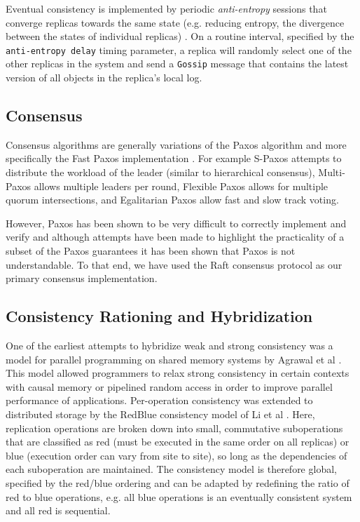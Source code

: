 \documentclass{article}
\begin{document}
Eventual consistency is implemented by periodic \textit{anti-entropy} sessions that converge replicas towards the same state (e.g. reducing entropy, the divergence between the states of individual replicas) \cite{kempe_gossip-based_2003, karp_randomized_2000}. On a routine interval, specified by the \texttt{anti-entropy delay} timing parameter, a replica will randomly select one of the other replicas in the system and send a \texttt{Gossip} message that contains the latest version of all objects in the replica's local log.

\subsection{Consensus}

Consensus algorithms are generally variations of the Paxos algorithm \cite{lamport_paxos_2001} and more specifically the Fast Paxos implementation \cite{lamport_fast_2006}. For example S-Paxos \cite{biely_s-paxos:_2012} attempts to distribute the workload of the leader (similar to hierarchical consensus), Multi-Paxos \cite{camargos_multicoordinated_2007} allows multiple leaders per round, Flexible Paxos \cite{2016arXiv160806696H} allows for multiple quorum intersections, and Egalitarian Paxos \cite{moraru_egalitarian_2012,moraru_there_2013} allow fast and slow track voting.

However, Paxos has been shown to be very difficult to correctly implement and verify \cite{chandra_paxos_2007} and although attempts have been made to highlight the practicality of a subset of the Paxos guarantees \cite{mazieres_paxos_2007} it has been shown that Paxos is not understandable. To that end, we have used the Raft consensus protocol \cite{ongaro_search_2014, howard_raft_2015} as our primary consensus implementation.

\subsection{Consistency Rationing and Hybridization}

One of the earliest attempts to hybridize weak and strong consistency was a model for parallel programming on shared memory systems by Agrawal et al \cite{agrawal_mixed_1994}. This model allowed programmers to relax strong consistency in certain contexts with causal memory or pipelined random access in order to improve parallel performance of applications. Per-operation consistency was extended to distributed storage by the RedBlue consistency model of Li et al \cite{li_making_2012}. Here, replication operations are broken down into small, commutative suboperations that are classified as red (must be executed in the same order on all replicas) or blue (execution order can vary from site to site), so long as the dependencies of each suboperation are maintained. The consistency model is therefore global, specified by the red/blue ordering and can be adapted by redefining the ratio of red to blue operations, e.g. all blue operations is an eventually consistent system and all red is sequential.
\end{document}
